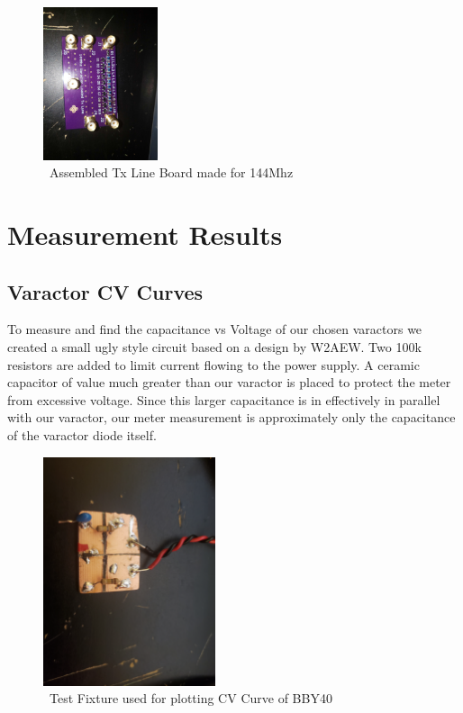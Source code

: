 \documentclass[journal]{IEEEtran}
\begin{document}
\begin{figure}[htb]
\centering
\includegraphics[width=0.3\textwidth, angle = 90]{AssembledBoard.jpg}
\caption{\ Assembled Tx Line Board made for 144Mhz
}\label{fig:assembled}
\end{figure}





\section{ Measurement Results }






\subsection{Varactor CV Curves}\label{subsec:CVCurves}

To measure and find the capacitance vs Voltage of our chosen varactors we created a small ugly style circuit based on a design by W2AEW. Two 100k resistors are added to limit current flowing to the power supply. A ceramic capacitor of value much greater than our varactor is placed to protect the meter from excessive voltage. Since this larger capacitance is in effectively in parallel with our varactor, our meter measurement is approximately only the capacitance of the varactor diode itself. 

\begin{figure}[htb]
\centering
\includegraphics[width=0.45\textwidth]{BBY40_capacitance_testfixture}
\caption{\ Test Fixture used for plotting CV Curve of BBY40
}\label{fig:CVTestFixt}
\end{figure}
\end{document}
